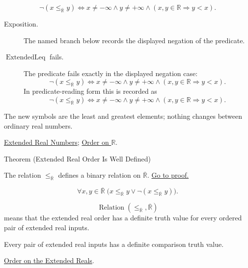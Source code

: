 \begin{remark*}
\[
\neg(x\le_{\overline{\mathbb{R}}}y)
\Longleftrightarrow
x\ne-\infty\land y\ne+\infty\land
(x,y\in\mathbb{R}\Rightarrow y<x).
\]
\end{remark*}

\begin{remark*}
\begin{description}
  \item[Exposition.] The named branch below records the displayed negation of the predicate.
  \item[\(\operatorname{ExtendedLeq}\) fails.] The predicate fails exactly in the displayed negation case:
  \[
  \neg(x\le_{\overline{\mathbb{R}}}y)
  \Longleftrightarrow
  x\ne-\infty\land y\ne+\infty\land
  (x,y\in\mathbb{R}\Rightarrow y<x).
  \]
  In predicate-reading form this is recorded as
  \[
  \neg(x\le_{\overline{\mathbb{R}}}y)
  \Longleftrightarrow
  x\ne-\infty\land y\ne+\infty\land
  (x,y\in\mathbb{R}\Rightarrow y<x).
  \]
\end{description}
\end{remark*}
\begin{remark*}[Interpretation]
The new symbols are the least and greatest elements; nothing changes between
ordinary real numbers.
\end{remark*}
\begin{dependencies}
\hyperref[def:extended-real-numbers]{Extended Real Numbers};
\hyperref[def:order-on-r]{Order on $\mathbb{R}$}.
\end{dependencies}

\begin{theorembox}{Theorem (Extended Real Order Is Well Defined)}
\begin{theorem}
\label{thm:extended-real-order-well-defined}
The relation $\le_{\overline{\mathbb{R}}}$ defines a binary relation on
$\overline{\mathbb{R}}$.
\hyperref[prf:extended-real-order-well-defined]{Go to proof.}
\end{theorem}
\end{theorembox}
\begin{remark*}
\[
\forall x,y\in\overline{\mathbb{R}}\;
\bigl(x\le_{\overline{\mathbb{R}}}y\lor \neg(x\le_{\overline{\mathbb{R}}}y)\bigr).
\]
\end{remark*}
\begin{remark*}
\[
\operatorname{Relation}(\le_{\overline{\mathbb{R}}},\overline{\mathbb{R}})
\]
means that the extended real order has a definite truth value for every ordered pair of extended real inputs.
\end{remark*}
\begin{remark*}[Interpretation]
Every pair of extended real inputs has a definite comparison truth value.
\end{remark*}
\begin{dependencies}
\hyperref[def:extended-real-order]{Order on the Extended Reals}.
\end{dependencies}

